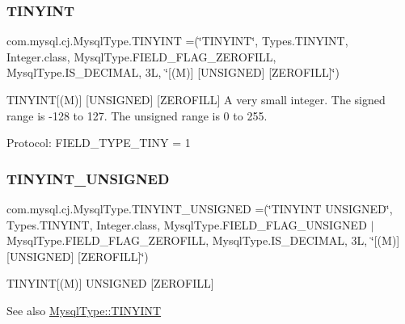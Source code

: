 \subsubsection{\texorpdfstring{T\+I\+N\+Y\+I\+NT}{TINYINT}}
{\footnotesize\ttfamily com.\+mysql.\+cj.\+Mysql\+Type.\+T\+I\+N\+Y\+I\+NT =(\char`\"{}T\+I\+N\+Y\+I\+NT\char`\"{}, Types.\+T\+I\+N\+Y\+I\+NT, Integer.\+class, Mysql\+Type.\+F\+I\+E\+L\+D\+\_\+\+F\+L\+A\+G\+\_\+\+Z\+E\+R\+O\+F\+I\+LL, Mysql\+Type.\+I\+S\+\_\+\+D\+E\+C\+I\+M\+AL, 3\+L, \char`\"{}\mbox{[}(\+M)\mbox{]} \mbox{[}\+U\+N\+S\+I\+G\+N\+E\+D\mbox{]} \mbox{[}\+Z\+E\+R\+O\+F\+I\+L\+L\mbox{]}\char`\"{})}

T\+I\+N\+Y\+I\+NT\mbox{[}(M)\mbox{]} \mbox{[}U\+N\+S\+I\+G\+N\+ED\mbox{]} \mbox{[}Z\+E\+R\+O\+F\+I\+LL\mbox{]} A very small integer. The signed range is -\/128 to 127. The unsigned range is 0 to 255.

Protocol\+: F\+I\+E\+L\+D\+\_\+\+T\+Y\+P\+E\+\_\+\+T\+I\+NY = 1 \mbox{\label{enumcom_1_1mysql_1_1cj_1_1_mysql_type_a1c7d8b3f1301ee4a89e044bb753725ba}} 
\subsubsection{\texorpdfstring{T\+I\+N\+Y\+I\+N\+T\+\_\+\+U\+N\+S\+I\+G\+N\+ED}{TINYINT\_UNSIGNED}}
{\footnotesize\ttfamily com.\+mysql.\+cj.\+Mysql\+Type.\+T\+I\+N\+Y\+I\+N\+T\+\_\+\+U\+N\+S\+I\+G\+N\+ED =(\char`\"{}T\+I\+N\+Y\+I\+NT U\+N\+S\+I\+G\+N\+ED\char`\"{}, Types.\+T\+I\+N\+Y\+I\+NT, Integer.\+class, Mysql\+Type.\+F\+I\+E\+L\+D\+\_\+\+F\+L\+A\+G\+\_\+\+U\+N\+S\+I\+G\+N\+ED $\vert$ Mysql\+Type.\+F\+I\+E\+L\+D\+\_\+\+F\+L\+A\+G\+\_\+\+Z\+E\+R\+O\+F\+I\+LL, Mysql\+Type.\+I\+S\+\_\+\+D\+E\+C\+I\+M\+AL, 3\+L, \char`\"{}\mbox{[}(\+M)\mbox{]} \mbox{[}\+U\+N\+S\+I\+G\+N\+E\+D\mbox{]} \mbox{[}\+Z\+E\+R\+O\+F\+I\+L\+L\mbox{]}\char`\"{})}

T\+I\+N\+Y\+I\+NT\mbox{[}(M)\mbox{]} U\+N\+S\+I\+G\+N\+ED \mbox{[}Z\+E\+R\+O\+F\+I\+LL\mbox{]}

\begin{DoxySeeAlso}{See also}
\mbox{\hyperlink{enumcom_1_1mysql_1_1cj_1_1_mysql_type_a87adada40b706dcea9427e4cf5294ed8}{Mysql\+Type\+::\+T\+I\+N\+Y\+I\+NT}} 
\end{DoxySeeAlso}
\mbox{\label{enumcom_1_1mysql_1_1cj_1_1_mysql_type_a86e06f00235ee92184960c872d76076f}} 
